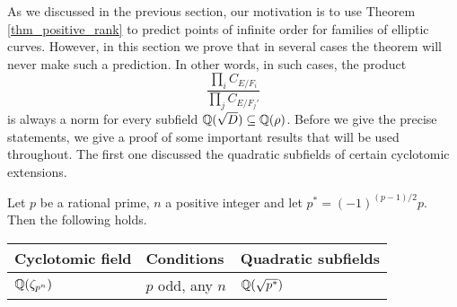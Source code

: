 As we discussed in the previous section, our motivation is to use Theorem \ref*{thm_positive_rank} to predict points of infinite order for families of elliptic curves. However, in this section we prove that in several cases the theorem will never make such a prediction. In other words, in such cases, the product 
$$\frac{\prod_i C_{E/F_i}}{\prod_j C_{E/F_j'}}$$ 
is always a norm for every subfield $\mathbb{Q}(\sqrt{D})\subseteq\mathbb{Q}(\rho)$. Before we give the precise statements, we give a proof of some important results that will be used throughout. The first one discussed the quadratic subfields of certain cyclotomic extensions.

\begin{lemma}\label{lem_subfields}
    Let $p$ be a rational prime, $n$ a positive integer and let $p^*=(-1)^{(p-1)/2}p$. Then the following holds.

    \begin{table}[!ht]
        \centering
        \begin{tabular}{|l|l|l|}
        \hline
        Cyclotomic field                     & Conditions & Quadratic subfields                   \\ \hline
        $\mathbb{Q}(\zeta_{p^n})$                   & $p$ odd, any $n$    & $\mathbb{Q}(\sqrt{p^*})$            \\ \hline
        \end{tabular}
        \end{table}

\end{lemma}

